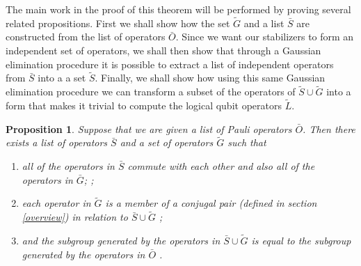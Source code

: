 \documentclass[twocolumn,showpacs,preprintnumbers,amsmath,amssymb,nofootinbib,pra,floatfix]{revtex4}
\newtheorem{proposition}{Proposition}
\newenvironment{remark}[1][Remark]{\begin{trivlist}
\item[\hskip \labelsep {\bfseries #1}]}{\end{trivlist}}
\newcommand{\lst}{\bar}
\newcommand{\set}{\tilde}
\begin{document}
\begin{remark}
The main work in the proof of this theorem will be performed by proving several related propositions.  First we shall show how the set $\set G$ and a list $\lst S$ are constructed from the list of operators $\lst O$.  Since we want our stabilizers to form an independent set of operators, we shall then show that through a Gaussian elimination procedure it is possible to extract a list of independent operators from $\lst S$ into a a set $\set S$.  Finally, we shall show how using this same Gaussian elimination procedure we can transform a subset of the operators of $\set S\cup\set G$ into a form that makes it trivial to compute the logical qubit operators $\set L$.
\end{remark}
\begin{proposition} \label{proposition-SG} Suppose that we are given a list of Pauli operators $\lst O$.  Then there exists a list of operators $\lst S$ and a set of operators $\set G$ such that
\begin{enumerate}
\item all of the operators in $\lst S$ commute with each other and also all of the operators in $\lst G$; \label{stabs-commute-with-G};
\item each operator in $\set G$ is a member of a \emph{conjugal pair} (defined in section \ref{overview}) in relation to $\lst S \cup \set G $ \label{conjugal-pairs-commute-with-SAG};
\item and the subgroup generated by the operators in $\lst S\cup \set G$ is equal to the subgroup generated by the operators in $\lst O$ \label{SAG-spans-all}.
\end{enumerate}
\end{proposition}
\end{document}

